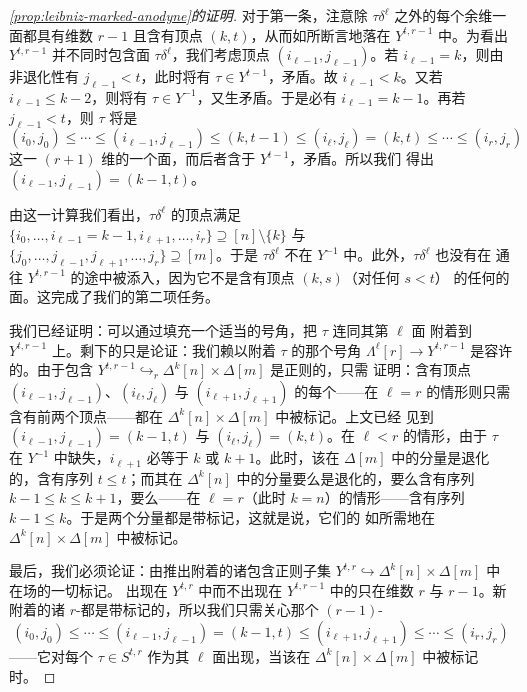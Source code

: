 \begin{proof}[\cref{prop:leibniz-marked-anodyne}的证明]
对于第一条，注意除 $\tau\delta^{\ell}$ 之外的每个余维一面都具有维数 $r-1$
且含有顶点 $(k,t)$，从而如所断言地落在 $Y^{t,r-1}$ 中。为看出
$Y^{t,r-1}$ 并不同时包含面 $\tau\delta^{\ell}$，我们考虑顶点
$(i_{\ell-1},j_{\ell-1})$。若 $i_{\ell-1}=k$，则由非退化性有
$j_{\ell-1}<t$，此时将有 $\tau\in Y^{t-1}$，矛盾。故 $i_{\ell-1}<k$。又若
$i_{\ell-1}\le k-2$，则将有 $\tau\in Y^{-1}$，又生矛盾。于是必有
$i_{\ell-1}=k-1$。再若 $j_{\ell-1}<t$，则 $\tau$ 将是
\[ (i_{0},j_{0})\le\cdots\le(i_{\ell-1},j_{\ell-1})\le(k,t-1)
   \le(i_{\ell},j_{\ell})=(k,t)\le\cdots\le(i_{r},j_{r}) \]
这一 $(r+1)$ 维\trSimplex{}的一个面，而后者含于 $Y^{t-1}$，矛盾。所以我们
得出 $(i_{\ell-1},j_{\ell-1})=(k-1,t)$。

由这一计算我们看出，$\tau\delta^{\ell}$ 的顶点满足
$\{i_{0},\dots,i_{\ell-1}=k-1,i_{\ell+1},\dots,i_{r}\}\supseteq[n]\setminus\{k\}$ 与
$\{j_{0},\dots,j_{\ell-1},j_{\ell+1},\dots,j_{r}\}\supseteq[m]$。于是
$\tau\delta^{\ell}$ 不在 $Y^{-1}$ 中。此外，$\tau\delta^{\ell}$ 也没有在
通往 $Y^{t,r-1}$ 的途中被添入，因为它不是含有顶点 $(k,s)$（对任何 $s<t$）
的任何\trSimplex{}的面。这完成了我们的第二项任务。

我们已经证明：可以通过填充一个适当的号角，把 $\tau$ 连同其第 $\ell$ 面
附着到 $Y^{t,r-1}$ 上。剩下的只是论证：我们赖以附着 $\tau$ 的那个号角
$\Lambda^{\ell}[r]\to Y^{t,r-1}$ 是容许的。由于包含
$Y^{t,r-1}\hookrightarrow_{r}\Delta^{k}[n]\times\Delta[m]$ 是正则的，只需
证明：含有顶点 $(i_{\ell-1},j_{\ell-1})$、$(i_{\ell},j_{\ell})$ 与
$(i_{\ell+1},j_{\ell+1})$ 的每个\trSimplex{}——在 $\ell=r$ 的情形则只需
含有前两个顶点——都在 $\Delta^{k}[n]\times\Delta[m]$ 中被标记。上文已经
见到 $(i_{\ell-1},j_{\ell-1})=(k-1,t)$ 与 $(i_{\ell},j_{\ell})=(k,t)$。在
$\ell<r$ 的情形，由于 $\tau$ 在 $Y^{-1}$ 中缺失，$i_{\ell+1}$ 必等于 $k$
或 $k+1$。此时，该\trSimplex{}在 $\Delta[m]$ 中的分量是退化的，含有序列
$t\le t$；而其在 $\Delta^{k}[n]$ 中的分量要么是退化的，要么含有序列
$k-1\le k\le k+1$，要么——在 $\ell=r$（此时 $k=n$）的情形——含有序列
$k-1\le k$。于是两个分量都是带标记\trSimplex，这就是说，它们的%
\trProduct{}如所需地在 $\Delta^{k}[n]\times\Delta[m]$ 中被标记。

最后，我们必须论证：由推出附着的诸\trSimplex{}包含正则子集
$Y^{t,r}\hookrightarrow\Delta^{k}[n]\times\Delta[m]$ 中在场的一切标记。
出现在 $Y^{t,r}$ 中而不出现在 $Y^{t,r-1}$ 中的\trSimplex{}只在维数 $r$ 与
$r-1$。新附着的诸 $r$-\trSimplex{}都是带标记的，所以我们只需关心那个
$(r-1)$-\trSimplex{}
\[ (i_{0},j_{0})\le\cdots\le(i_{\ell-1},j_{\ell-1})=(k-1,t)
   \le(i_{\ell+1},j_{\ell+1})\le\cdots\le(i_{r},j_{r}) \]
——它对每个 $\tau\in S^{t,r}$ 作为其 $\ell$ 面出现，当该\trSimplex{}在
$\Delta^{k}[n]\times\Delta[m]$ 中被标记时。


\end{proof}
